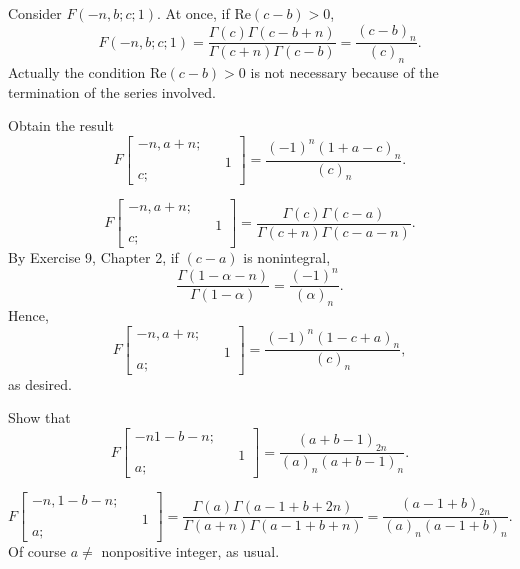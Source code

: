 \begin{solution}
Consider $F(-n,b;c;1).$
At once, if $\mathrm{Re}(c-b)>0$,
$$F(-n,b;c;1) = \dfrac{\Gamma(c) \Gamma(c-b+n)}{\Gamma(c+n)\Gamma(c-b)} = \dfrac{(c-b)_n}{(c)_n}.$$
Actually the condition $\mathrm{Re}(c-b)>0$ is not necessary because of the termination of the series involved.
\end{solution}
\begin{problem}\label{problem5chapter4}
Obtain the result 
$$F \left[ \begin{array}{rlr}
-n,a+n; & & \\
& & 1 \\
c; & 
\end{array} \right] = \dfrac{(-1)^n (1+a-c)_n}{(c)_n}.$$
\end{problem}
\begin{solution}
$$F \left[ \begin{array}{rlr}
-n, a+n; & & \\
& & 1 \\
c; & &
\end{array} \right] = \dfrac{\Gamma(c) \Gamma(c-a)}{\Gamma(c+n) \Gamma(c-a-n)}.$$
By Exercise 9, Chapter 2, if $(c-a)$ is nonintegral,
$$\dfrac{\Gamma(1-\alpha-n)}{\Gamma(1-\alpha)} = \dfrac{(-1)^n}{(\alpha)_n}.$$
Hence,
$$F \left[ \begin{array}{rlr}
-n, a+n; & & \\
& & 1 \\
a; & &
\end{array} \right] = \dfrac{(-1)^n ( 1-c+a)_n}{(c)_n},$$
as desired.
\end{solution}
\begin{problem}\label{problem6chapter4}
Show that
$$F \left[ \begin{array}{rlr}
-n 1-b-n; & & \\
& & 1 \\
a; & &
\end{array} \right] = \dfrac{(a+b-1)_{2n}}{(a)_n(a+b-1)_n}.$$
\end{problem}
\begin{solution}
$$F \left[ \begin{array}{rlr}
-n,1-b-n; & & \\
& & 1 \\
a; & & 
\end{array} \right] = \dfrac{\Gamma(a) \Gamma(a-1+b+2n)}{\Gamma(a+n)\Gamma(a-1+b+n)} = \dfrac{(a-1+b)_{2n}}{(a)_n (a-1+b)_n}.$$
Of course $a \neq$ nonpositive integer, as usual.
\end{solution}
